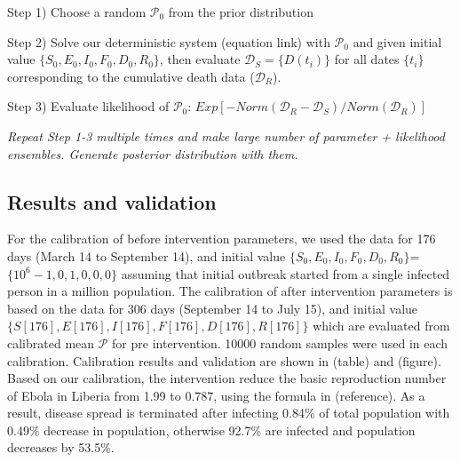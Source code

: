 Step 1) Choose a random $\mathcal{P}_0$ from the prior distribution

Step 2) Solve our deterministic system (equation link) with $\mathcal{P}_0$ and given initial value $\{S_0,E_0,I_0,F_0,D_0,R_0\}$, then evaluate $\mathcal{D}_S=\{D(t_i)\}$ for all dates $\{t_i\}$ corresponding to the cumulative death data ($\mathcal{D}_R$).

Step 3) Evaluate likelihood of $\mathcal{P}_0$: $Exp[-Norm(\mathcal{D}_R-\mathcal{D}_S)/Norm(\mathcal{D}_R)]$

\emph{Repeat Step 1-3 multiple times and make large number of {parameter + likelihood} ensembles. Generate posterior distribution with them.}

\subsection{Results and validation}
For the calibration of before intervention parameters, we used the data for 176 days (March 14 to September 14), and initial value $\{S_0,E_0,I_0,F_0,D_0,R_0\}$=$\{10^6-1,0,1,0,0,0\}$ assuming that initial outbreak started from a single infected person in a million population. The calibration of after intervention parameters is based on the data for 306 days (September 14 to July 15), and initial value $\{S[176],E[176],I[176],F[176],D[176],R[176]\}$ which are evaluated from calibrated mean $\mathcal{P}$ for pre intervention. 10000 random samples were used in each calibration. Calibration results and validation are shown in (table) and (figure).\\
Based on our calibration, the intervention reduce the basic reproduction number of Ebola in Liberia from 1.99 to 0.787, using the formula in (reference). As a result, disease spread is terminated after infecting 0.84\% of total population with 0.49\% decrease in population, otherwise 92.7\% are infected and population decreases by 53.5\%.\\


